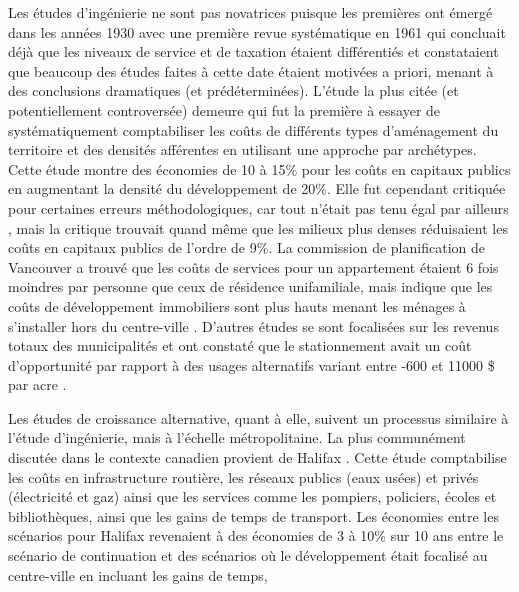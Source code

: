         Les études d'ingénierie ne sont pas novatrices puisque les premières ont émergé dans les années 1930 \parencite{the_city_planning_board_report_1934} avec une première revue systématique en 1961 \parencite{mace_municipal_1961} qui concluait déjà que les niveaux de service et de taxation étaient différentiés et constataient que beaucoup des études faites à cette date étaient motivées a priori, menant à des conclusions dramatiques (et prédéterminées). L'étude la plus citée (et potentiellement controversée) demeure   \fg{} \parencite{real_estate_research_corporation_costs_1974,real_estate_research_corporation_costs_1974-1} qui fut la première à essayer de systématiquement comptabiliser les coûts de différents types d'aménagement du territoire et des densités afférentes en utilisant une approche par archétypes. Cette étude montre des économies de 10 à 15\% pour les coûts en capitaux publics en augmentant la densité du développement de 20\%. Elle fut cependant critiquée pour certaines erreurs méthodologiques, car tout n'était pas tenu égal par ailleurs \parencite{windsor_critique_1979}, mais la critique trouvait quand même que les milieux plus denses réduisaient les coûts en capitaux publics de l'ordre de 9\%. La commission de planification de Vancouver a trouvé que les coûts de services pour un appartement étaient 6 fois moindres par personne que ceux de résidence unifamiliale, mais indique que les coûts de développement immobiliers sont plus hauts menant les ménages à s'installer hors du centre-ville \parencite{metro_vancouver_regional_planning_cost_2023}. D'autres études se sont focalisées sur les revenus totaux des municipalités et ont constaté que le stationnement avait un coût d'opportunité par rapport à des usages alternatifs variant entre -600 et 11000 \$ par acre \parencite{blanc_effects_2014}.\par
        Les études de croissance alternative, quant à elle, suivent un processus similaire à l'étude d'ingénierie, mais à l'échelle métropolitaine. La plus communément discutée dans le contexte canadien provient de Halifax \parencite{stantec_consulting_ltd_quantifying_2013}. Cette étude comptabilise les coûts en infrastructure routière, les réseaux publics (eaux usées) et privés (électricité et gaz) ainsi que les services comme les pompiers, policiers, écoles et bibliothèques, ainsi que les gains de temps de transport.  Les économies entre les scénarios pour Halifax revenaient à des économies de 3 à 10\% sur 10 ans entre le scénario de continuation et des scénarios où le développement était focalisé au centre-ville en incluant les gains de temps, \par

